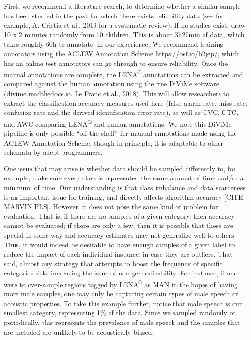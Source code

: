 \documentclass[english,table,man,floatsintext]{apa6}
\begin{document}
First, we recommend a literature search, to determine whether a similar
sample has been studied in the past for which there exists reliability
data (see for example, A. Cristia et al., 2019 for a systematic review).
If no studies exist, draw 10 x 2 minutes randomly from 10 children. This
is about 3h20min of data, which takes roughly 60h to annotate, in our
experience. We recommend training annotators using the ACLEW Annotation
Scheme \url{https://osf.io/b2jep/}, which has an online test annotators
can go through to ensure reliability. Once the manual annotations are
complete, the LENA\textsuperscript{®} annotations can be extracted and
compared against the human annotation using the free DiViMe software
(divime.readthedocs.io, Le Franc et al., 2018). This will allow
researchers to extract the classification accuracy measures used here
(false alarm rate, miss rate, confusion rate and the derived
identification error rate), as well as CVC, CTC, and AWC comparing
LENA\textsuperscript{®} and human annotations. We note this DiViMe
pipeline is only possible \enquote{off the shelf} for manual annotations
made using the ACLEW Annotation Scheme, though in principle, it is
adaptable to other schemata by adept programmers.

One issue that may arise is whether data should be sampled differently
to, for example, make sure every class is represented the same amount of
time and/or a minimum of time. Our understanding is that class imbalance
and data scarceness is an important issue for training, and directly
affects algorithm accuracy {[}CITE MARVIN PLS{]}. However, it does not
pose the same kind of problem for evaluation. That is, if there are no
samples of a given category, then accuracy cannot be evaluated; if there
are only a few, then it is possible that these are special in some way
and accuracy estimates may not generalize well to others. Thus, it would
indeed be desirable to have enough samples of a given label to reduce
the impact of each individual instance, in case they are outliers. That
said, almost any strategy that attempts to boost the frequency of
specific categories risks increasing the issue of non-generalizability.
For instance, if one were to over-sample regions tagged by
LENA\textsuperscript{®} as MAN in the hopes of having more male samples,
one may only be capturing certain types of male speech or acoustic
properties. To take this example further, notice that male speech is our
smallest category, representing 1\% of the data. Since we sampled
randomly or periodically, this represents the prevalence of male speech
and the samples that are included are unlikely to be acoustically
biased.
\end{document}
